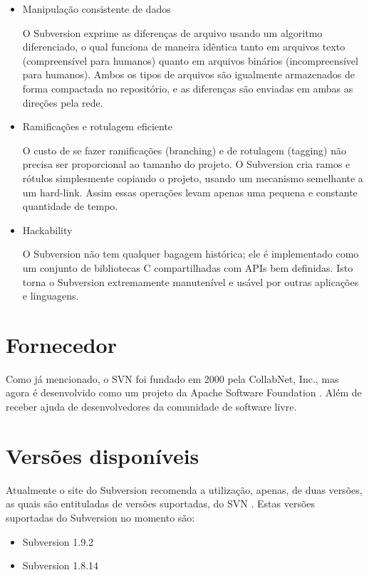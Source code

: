 \begin{itemize}
  \item Manipulação consistente de dados

  O Subversion exprime as diferenças de arquivo usando um algoritmo diferenciado, o qual funciona de maneira idêntica tanto em arquivos texto (compreensível para humanos) quanto em arquivos binários (incompreensível para humanos). Ambos os tipos de arquivos são igualmente armazenados de forma compactada no repositório, e as diferenças são enviadas em ambas as direções pela rede.

  \item Ramificações e rotulagem eficiente

  O custo de se fazer ramificações (branching) e de rotulagem (tagging) não precisa ser proporcional ao tamanho do projeto. O Subversion cria ramos e rótulos simplesmente copiando o projeto, usando um mecanismo semelhante a um hard-link. Assim essas operações levam apenas uma pequena e constante quantidade de tempo.

  \item Hackability

  O Subversion não tem qualquer bagagem histórica; ele é implementado como um conjunto de bibliotecas C compartilhadas com APIs bem definidas. Isto torna o Subversion extremamente manutenível e usável por outras aplicações e linguagens.

  \end{itemize}

\section{Fornecedor}

  Como já mencionado, o SVN foi fundado em 2000 pela CollabNet, Inc., mas agora é desenvolvido como um projeto da Apache Software Foundation \cite{svn-site-home}. Além de receber ajuda de desenvolvedores da comunidade de software livre.

\section{Versões disponíveis}

  Atualmente o site do Subversion recomenda a utilização, apenas, de duas versões, as quais são entituladas de versões suportadas, do SVN \cite{svn-site}. Estas versões suportadas do Subversion no momento são:

  \begin{itemize}
    \item Subversion 1.9.2 \footnotemark {}

    \item Subversion 1.8.14 \footnotemark {}

  \end{itemize}

